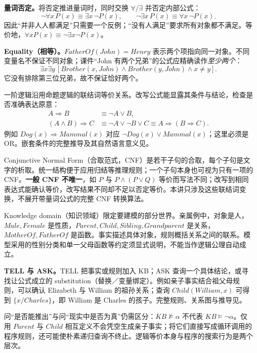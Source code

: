 \textbf{量词否定。}将否定推进量词时，同时交换 $\forall/\exists$ 并否定内部公式：
\[
 \neg\forall x\,P(x)\equiv\exists x\,\neg P(x),\qquad
 \neg\exists x\,P(x)\equiv\forall x\,\neg P(x).
\]
因此“并非人人都满足”只需要一个反例；“没有人满足”要求所有对象都不满足。等价地，$\forall xP(x)\equiv\neg\exists x\neg P(x)$。

\textbf{Equality（相等）。}$FatherOf(John)=Henry$ 表示两个项指向同一对象。不同变量名不保证不同对象；课件“John 有两个兄弟”的公式应精确读作\emph{至少两个}：
\[
 \exists x\exists y\,
 [Brother(x,John)\land Brother(y,John)\land x\ne y].
\]
它没有排除第三位兄弟，故不保证恰好两个。


一阶逻辑沿用命题逻辑的联结词等价关系。改写公式能显露其条件与结论，检查是否准确表达原意：
\begin{align*}
 A\Rightarrow B&\equiv\neg A\lor B,\\
 (A\land B)\Rightarrow C
 &\equiv\neg A\lor\neg B\lor C
 \equiv A\Rightarrow(B\Rightarrow C).
\end{align*}
例如 $Dog(x)\Rightarrow Mammal(x)$ 对应 $\neg Dog(x)\lor Mammal(x)$；这里必须是 OR。嵌套条件的完整推导及其自然语言意义见。

Conjunctive Normal Form（合取范式，CNF）是若干子句的合取，每个子句是文字的析取。统一结构便于应用归结等推理规则；一个子句本身也可视为只有一项的 CNF。\textbf{一般 CNF 不唯一}，如 $P$ 与 $P\land(P\lor Q)$ 等价而写法不同；改写到相同表达式能确认等价，改写结果不同却不足以否定等价。本讲只涉及这些联结词变换，不展开带量词公式的完整 CNF 转换算法。


Knowledge domain（知识领域）限定要建模的部分世界。亲属例中，对象是人，$Male,Female$ 是性质，$Parent,Child,Sibling,Grandparent$ 是关系，$MotherOf,FatherOf$ 是函数。事实描述具体对象，规则概括关系之间的联系。模型采用的性别分类和单一父母函数等约定须显式说明，不能当作逻辑公理自动成立。

\textbf{TELL 与 ASK。}TELL 把事实或规则加入 KB；ASK 查询一个具体结论，或寻找让公式成立的 substitution（替换／变量绑定）。例如亲子事实结合祖父母规则，可以确认 Elizabeth 与 William 的祖孙关系；查询 $Child(William,x)$ 可得到 $\{x/Charles\}$，即 William 是 Charles 的孩子。完整规则、关系图与推导见。

问“是否能推出”与问“现实中是否为真”仍需区分：$KB\not\models\alpha$ 不代表 $KB\models\neg\alpha$。仅用 $Parent$ 与 $Child$ 相互定义不会凭空生成亲子事实；将它们直接写成循环调用的程序规则，还可能使朴素递归查询不终止。逻辑等价本身与程序的搜索行为是两个层次。

